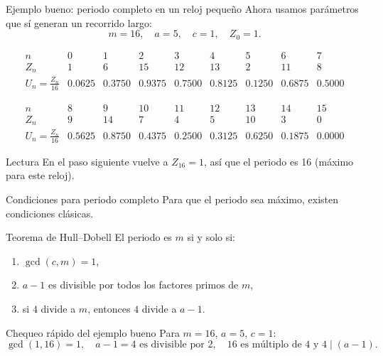 \documentclass[aspectratio=1610, 9pt]{beamer}
\begin{document}
\begin{frame}{Ejemplo bueno: periodo completo en un reloj pequeño}
    Ahora usamos parámetros que sí generan un recorrido largo:
    \[
    m=16,\quad a=5,\quad c=1,\quad Z_0=1.
    \]

    \vspace{0.15cm}
    \[
    \begin{array}{c|cccccccc}
    n & 0 & 1 & 2 & 3 & 4 & 5 & 6 & 7\\ \hline
    Z_n & 1 & 6 & 15 & 12 & 13 & 2 & 11 & 8\\
    U_n=\tfrac{Z_n}{16} & 0.0625 & 0.3750 & 0.9375 & 0.7500 & 0.8125 & 0.1250 & 0.6875 & 0.5000
    \end{array}
    \]

    \vspace{0.15cm}
    \[
    \begin{array}{c|cccccccc}
    n & 8 & 9 & 10 & 11 & 12 & 13 & 14 & 15\\ \hline
    Z_n & 9 & 14 & 7 & 4 & 5 & 10 & 3 & 0\\
    U_n=\tfrac{Z_n}{16} & 0.5625 & 0.8750 & 0.4375 & 0.2500 & 0.3125 & 0.6250 & 0.1875 & 0.0000
    \end{array}
    \]

    \vspace{0.2cm}
    \begin{exampleblock}{Lectura}
    En el paso siguiente vuelve a $Z_{16}=1$, así que el periodo es 16 (máximo para este reloj).
    \end{exampleblock}
\end{frame}

\begin{frame}{Condiciones para periodo completo}
    Para que el periodo sea máximo, existen condiciones clásicas.

    \vspace{0.25cm}
    \begin{block}{Teorema de Hull--Dobell}
    El periodo es $m$ si y solo si:
    \begin{enumerate}
        \item $\gcd(c,m)=1$,
        \item $a-1$ es divisible por todos los factores primos de $m$,
        \item si $4$ divide a $m$, entonces $4$ divide a $a-1$.
    \end{enumerate}
    \end{block}

    \vspace{0.2cm}
    \begin{exampleblock}{Chequeo rápido del ejemplo bueno}
        Para $m=16$, $a=5$, $c=1$:
        \[
        \gcd(1,16)=1,\quad a-1=4\text{ es divisible por }2,\quad 16\text{ es múltiplo de }4\text{ y }4\mid (a-1).
        \]
    \end{exampleblock}
\end{frame}
\end{document}
